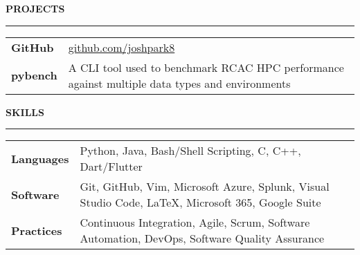 \documentclass[letter,11pt]{article}
\begin{document}
\textbf{PROJECTS}

\vspace*{-1.25em}
\rule{\textwidth}{1.2pt}

\begin{tabular}{@{}p{2.25cm}l}
  \textbf{GitHub} &\href{https://www.github.com/joshpark8}{github.com/joshpark8} \\
  \textbf{pybench} &A CLI tool used to benchmark RCAC HPC performance against multiple data types and environments
\end{tabular}
\vspace*{0.5em}

\textbf{SKILLS}

\vspace*{-1.25em}
\rule{\textwidth}{1.2pt}

\begin{tabular}{@{}p{2.25cm}l}
    \textbf{Languages} &Python, Java, Bash/Shell Scripting, C, C++, Dart/Flutter \\
    \textbf{Software} &Git, GitHub, Vim, Microsoft Azure, Splunk, Visual Studio Code, LaTeX, Microsoft 365, Google Suite \\
    \textbf{Practices} &Continuous Integration, Agile, Scrum, Software Automation, DevOps, Software Quality Assurance
\end{tabular}
\end{document}
